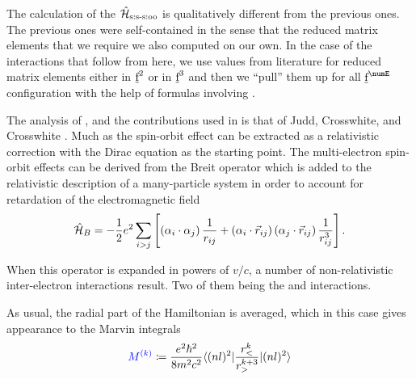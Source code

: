 \documentclass{article}
\begin{document}
    The calculation of the $\hat{\mathcal{H}}_{\text{s:s-s:oo}}$ is qualitatively different from the previous ones. The previous ones were self-contained in the sense that the reduced matrix elements that we require we also computed on our own. In the case of the interactions that follow from here, we use values from literature for reduced matrix elements either in $\underbar{$\text{f}$}^2$ or in $\underbar{$\text{f}$}^3$ and then we ``pull'' them up for all $\forb^{\numE}$ configuration with the help of formulas involving \cfps.

    The analysis of \soo, and the \spinspin contributions used in  \qlanth is that of Judd, Crosswhite, and Crosswhite \cite{judd_intra-atomic_1968}. Much as the spin-orbit effect can be extracted as a relativistic correction with the Dirac equation as the starting point. The multi-electron spin-orbit effects can be derived from the Breit operator \cite{bethe_quantum_1957} which is added to the relativistic description of a many-particle system in order to account for retardation of the electromagnetic field
    \begin{equation}
    \hat{\mathcal{H}}_B = -\frac{1}{2}e^2 \sum_{i>j} \left[ \left(\alpha_i\cdot\alpha_j\right)\frac{1}{r_{ij}} + \left(\alpha_i\cdot{\vec{r}_{ij}}\right)\left(\alpha_j\cdot\vec{r}_{ij}\right) \frac{1}{r_{ij}^3} \right].
    \end{equation}

    When this operator is expanded in powers of $v/c$, a number of non-relativistic inter-electron interactions result. Two of them being the \soo and \spinspin interactions.

    As usual, the radial part of the Hamiltonian is averaged, which in this case gives appearance to the Marvin integrals
    \begin{equation} 
    \textcolor{blue}{M^{(k)}} \coloneqq \frac{e^2\hbar^2}{8m^2c^2} \langle (nl)^2|\frac{r_<^k}{r_>^{k+3}}|(nl)^2\rangle
    \end{equation}
\end{document}
